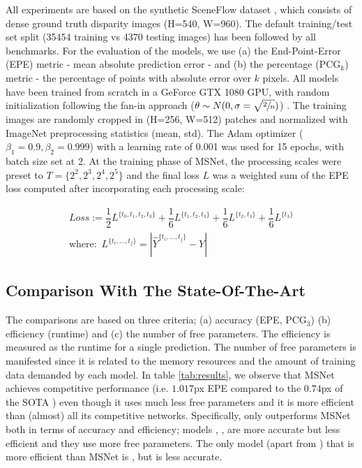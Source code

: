 \documentclass[runningheads]{llncs}
\begin{document}
All experiments are based on the synthetic SceneFlow dataset \cite{MIFDB16}, which consists of dense ground truth disparity images (H=540, W=960). The 
default training/test set split (35454 training vs 4370 testing images) has been followed by all benchmarks. For the evaluation of the models, we use (a) the End-Point-Error (EPE) metric - mean absolute prediction error - and (b) the percentage ($\text{PCG}_k$) metric - the percentage of points with absolute error over $k$ pixels. All models have been trained from scratch in a GeForce GTX 1080 GPU, with random initialization following the fan-in approach ($\theta \sim N(0,\sigma=\sqrt{\sfrac{2}{n}})$) \cite{He2015}. The training images are randomly cropped in (H=256, W=512) patches and normalized with ImageNet preprocessing statistics (mean, std). The Adam optimizer ($\beta_1 = 0.9, \beta_2=0.999$) with a learning rate of 0.001 was used for 15 epochs, with batch size set at 2. At the training phase of MSNet, the processing scales were preset to $T= \{2^2, 2^3, 2^4, 2^5\}$ and the final loss $L$ was a weighted sum of the EPE loss computed after incorporating each processing scale:

\begin{gather}
\textit{Loss} := \dfrac{1}{2}L^{\{t_0, t_1, t_2, t_3\}} +  \dfrac{1}{6}L^{\{t_1, t_2, t_3\}} + \dfrac{1}{6}L^{\{t_2, t_3\}} + \dfrac{1}{6}L^{\{t_3\}}\\
\text{where:} \; \ L^{\{t_i, ..., t_j\}} = |\hat{Y}^{\{t_i, ..., t_j\}} - Y |    
\end{gather}{}


\subsection{Comparison With The State-Of-The-Art}

The comparisons are based on three criteria; (a) accuracy (EPE, $\text{PCG}_3$) (b) efficiency (runtime) and (c) the number of free parameters. The efficiency is measured as the runtime for a single prediction. The number of free parameters is manifested since it is related to the memory resources and the amount of training data demanded by each model. In table \ref{tab:results}, we observe that MSNet achieves competitive performance (i.e. $1.017$px EPE compared to the $0.74$px of the SOTA \cite{du2019amnet}) even though it uses much less free parameters and it is more efficient than (almost) all its competitive networks. Specifically, only \cite{Duggal2019ICCV} outperforms MSNet both in terms of accuracy and efficiency; models \cite{cheng2018learning}, \cite{du2019amnet}, \cite{zhang2019ga} are more accurate but less efficient and they use more free parameters. The only model (apart from \cite{Duggal2019ICCV}) that is more efficient than MSNet is \cite{Mayer2016ALD}, but is less accurate.
\end{document}
